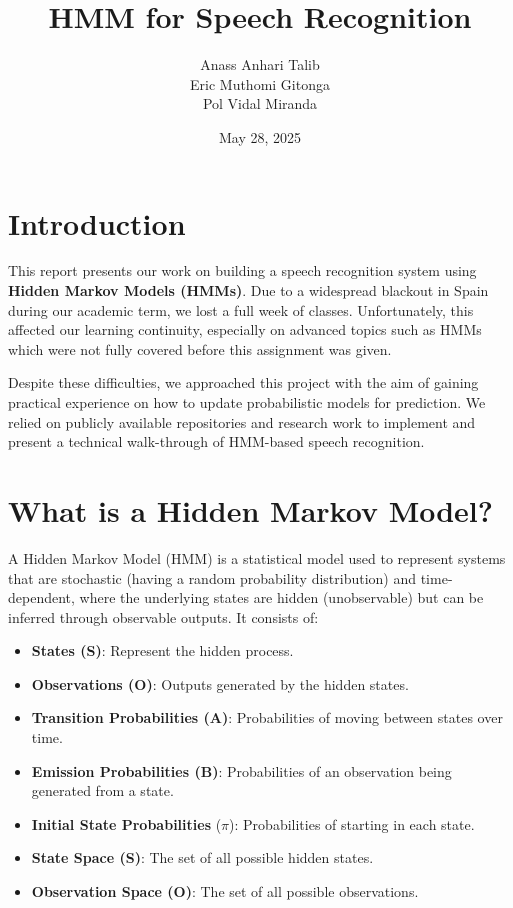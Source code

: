 \documentclass{article}
\title{HMM for Speech Recognition}
\author{Anass Anhari Talib \\ Eric Muthomi Gitonga \\ Pol Vidal Miranda}
\date{May 28, 2025}
\begin{document}
\maketitle

\section{Introduction}
    
    This report presents our work on building a speech recognition system using \textbf{Hidden Markov Models (HMMs)}. Due to a widespread blackout in Spain during our academic term, we lost a full week of classes. Unfortunately, this affected our learning continuity, especially on advanced topics such as HMMs which were not fully covered before this assignment was given.
    
    Despite these difficulties, we approached this project with the aim of gaining practical experience on how to update probabilistic models for prediction. We relied on publicly available repositories and research work to implement and present a technical walk-through of HMM-based speech recognition.
    
\section{What is a Hidden Markov Model?}
    A Hidden Markov Model (HMM) is a statistical model used to represent systems that are stochastic (having a random probability distribution) and time-dependent, where the underlying states are hidden (unobservable) but can be inferred through observable outputs. It consists of:
    
    \begin{itemize}
        \item \textbf{States (S)}: Represent the hidden process.
        \item \textbf{Observations (O)}: Outputs generated by the hidden states.
        \item \textbf{Transition Probabilities (A)}: Probabilities of moving between states over time.
        \item \textbf{Emission Probabilities (B)}: Probabilities of an observation being generated from a state.
        \item \textbf{Initial State Probabilities} ($\pi$): Probabilities of starting in each state.
        \item \textbf{State Space (S)}: The set of all possible hidden states.
        \item \textbf{Observation Space (O)}: The set of all possible observations.
    \end{itemize}
     
\end{document}
